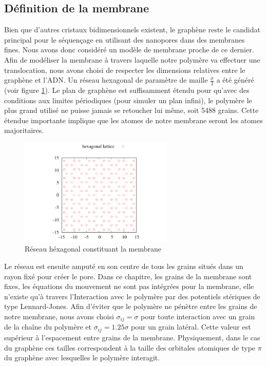 \subsection{Définition de la membrane}

Bien que d'autres cristaux bidimensionnels existent, le graphène reste le candidat principal pour le séquençage en utilisant des nanopores dans des membranes fines. Nous avons donc considéré un modèle de membrane proche de ce dernier.
Afin de modéliser la membrane à travers laquelle notre polymère va effectuer une translocation, nous avons choisi de respecter les dimensions relatives  entre le graphène et l'ADN. Un réseau hexagonal de paramètre de maille $\frac{\sigma}{2}$ a été généré (voir figure \ref{reseau}). Le plan de graphène est suffisamment étendu pour qu'avec des conditions aux limites périodiques (pour simuler un plan infini), le polymère le plus grand utilisé ne puisse jamais se retoucher lui même, soit 5488 grains. Cette étendue importante implique que les atomes de notre membrane seront les atomes majoritaires.

\begin{figure}[H]
\begin{center}
\includegraphics[width=0.65\textwidth]{lattice.pdf} 

\caption{Réseau héxagonal constituant la membrane}
\label{reseau}
\end{center}
\end{figure}

Le réseau est ensuite amputé en son centre de tous les grains situés dans un rayon fixé pour créer le pore. Dans ce chapitre, les grains de la membrane sont fixes, les équations du mouvement ne sont pas intégrées pour la membrane, elle n'existe qu'à travers l’Interaction avec le polymère par des potentiels stériques de type Lennard-Jones. Afin d'éviter que le polymère ne pénètre entre les grains de notre membrane, nous avons choisi $\sigma_{ij}=\sigma$ pour toute interaction avec un grain de la chaîne du polymère et $\sigma_{ij}=1.25\sigma$ pour un grain latéral. Cette valeur est supérieur à l'espacement entre grains de la membrane. Physiquement, dans le cas du graphène ces tailles correspondent à la taille des orbitales atomiques de type $\pi$ du graphène avec lesquelles le polymère interagit.


